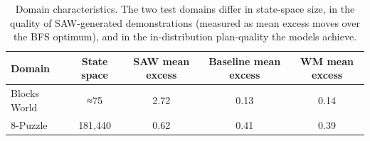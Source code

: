 \begin{table}[t]
\centering
\caption{Domain characteristics. The two test domains differ in state-space size, in the quality of SAW-generated demonstrations (measured as mean excess moves over the BFS optimum), and in the in-distribution plan-quality the models achieve.}
\label{tab:domain}
\begin{tabular}{lcccc}
\toprule
Domain & State space & SAW mean excess & Baseline mean excess & WM mean excess \\
\midrule
Blocks World & ≈75 & 2.72 & 0.13 & 0.14 \\
8-Puzzle & 181{,}440 & 0.62 & 0.41 & 0.39 \\
\bottomrule
\end{tabular}
\end{table}

